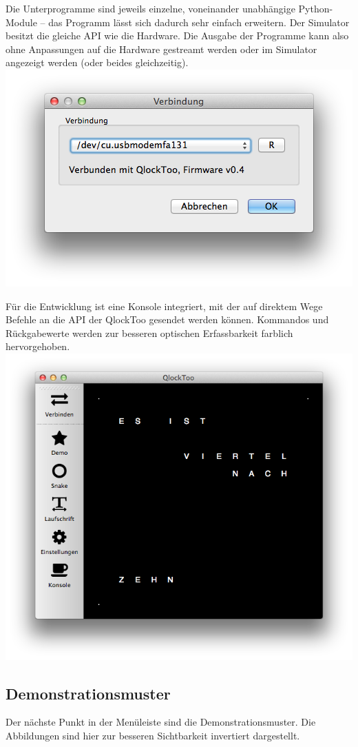 \begin{multicols}{2}
Die Unterprogramme sind jeweils einzelne, voneinander unabhängige Python-Module -- das Programm lässt sich dadurch sehr einfach erweitern.
Der Simulator besitzt die gleiche API wie die Hardware. Die Ausgabe der Programme kann also ohne Anpassungen auf die Hardware gestreamt werden oder im Simulator angezeigt werden (oder beides gleichzeitig).
\includegraphics[width=\columnwidth]{Abbildungen/Software/ConnectDialog}

Für die Entwicklung ist eine Konsole integriert, mit der auf direktem Wege Befehle an die API der QlockToo gesendet werden können. Kommandos und Rückgabewerte werden zur besseren optischen Erfassbarkeit farblich hervorgehoben.
\includegraphics[width=0.9\columnwidth,draft]{Abbildungen/Software/Manager}


\subsection{Demonstrationsmuster}
Der nächste Punkt in der Menüleiste sind die Demonstrationsmuster.
Die Abbildungen sind hier zur besseren Sichtbarkeit invertiert dargestellt.


\end{multicols}

